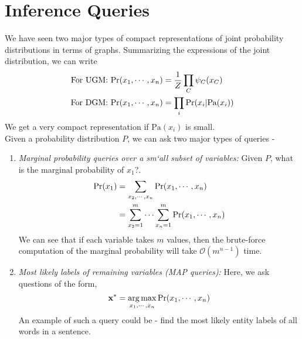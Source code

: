 \section{Inference Queries}
We have seen two major types of compact representations of joint probability distributions in terms of graphs. Summarizing the expressions of the joint distribution, we can write
\begin{align}
\text{For UGM: }\text{Pr}(x_1, \cdots, x_n) &= \dfrac{1}{Z}\prod_C \psi_C(x_C) \\
\text{For DGM: }\text{Pr}(x_1, \cdots, x_n) &= \prod_i \text{Pr}(x_i|\text{Pa}(x_i))
\end{align}
We get a very compact representation if $\text{Pa}(x_i)$ is small. \\
Given a probability distribution $P$, we can ask two major types of queries - 
\begin{enumerate}
	\item \textit{Marginal probability queries over a sm`all subset of variables: }Given $P$, what is the marginal probability of $x_1$?.
	\begin{equation}
	\begin{split}
		\text{Pr}(x_1) &= \sum_{x_2, \cdots, x_n} \text{Pr}(x_1, \cdots, x_n) \\
		&= \sum_{x_2=1}^m \cdots \sum_{x_n=1}^m \text{Pr}(x_1, \cdots, x_n)
	\end{split}
	\end{equation}
We can see that if each variable takes $m$ values, then the brute-force computation of the marginal probability will take $\mathcal{O}(m^{n-1})$ time.
\item \textit{Most likely labels of remaining variables (MAP queries): }Here, we ask questions of the form,
\begin{equation}
	\mathbf{x}^* = \operatorname*{arg\,max}_{x_1, \cdots, x_n} \text{Pr}(x_1, \cdots, x_n)
\end{equation}
An example of such a query could be - find the most likely entity labels of all words in a sentence.
\end{enumerate}
